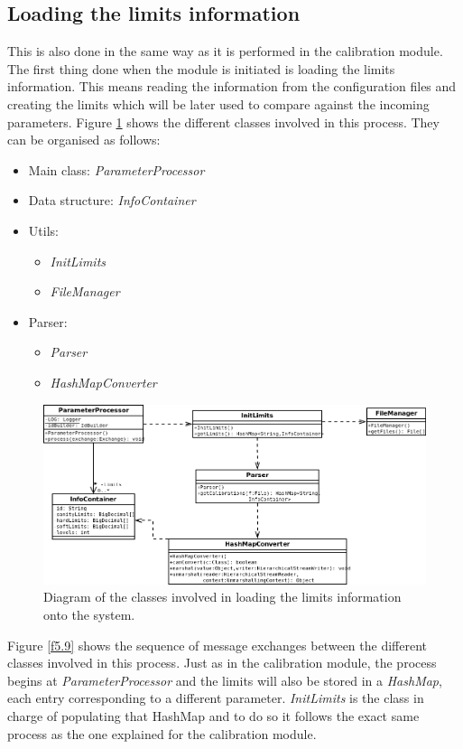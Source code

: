 \subsection{Loading the limits information}
This is also done in the same way as it is performed in the calibration module. The first thing done when the module is initiated is loading the limits information. This means reading the information from the configuration files and creating the limits which will be later used to compare against the incoming parameters.
Figure \ref{f5.8} shows the different classes involved in this process. They can be organised as follows:
\begin{itemize}
\item Main class: \emph{ParameterProcessor}
\item Data structure: \emph{InfoContainer}
\item Utils:
	\begin{itemize}
		\item \emph{InitLimits}
		\item \emph{FileManager}
	\end{itemize}
\item Parser:
	\begin{itemize}
		\item \emph{Parser}
		\item \emph{HashMapConverter}
	\end{itemize}
\end{itemize}

\begin{figure}[H]
\centerline{\includegraphics[width=1.3\textwidth]{images/LoadLimitsClassDiagram.png}}
\caption{Diagram of the classes involved in loading the limits information onto the system.}
\label{f5.8}
\end{figure}
\pagebreak

Figure \ref{f5.9} shows the sequence of message exchanges between the different classes involved in this process. Just as in the calibration module, the process begins at \emph{ParameterProcessor} and the limits will also be stored in a \emph{HashMap}, each entry corresponding to a different parameter. \emph{InitLimits} is the class in charge of populating that HashMap and to do so it follows the exact same process as the one explained for the calibration module. 



